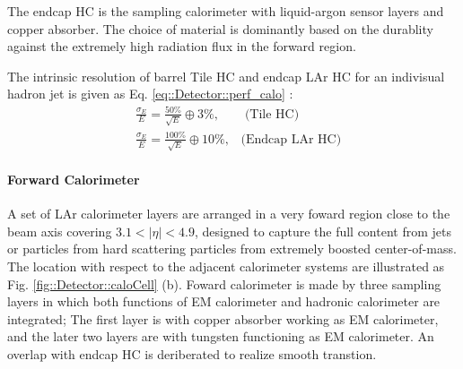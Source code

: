 The endcap HC is the sampling calorimeter with liquid-argon sensor layers and copper absorber. 
The choice of material is dominantly based on the durablity against the extremely high radiation flux in the forward region.


The intrinsic resolution of barrel Tile HC and endcap LAr HC for an indivisual hadron jet is given as Eq. \ref{eq::Detector::perf_calo} \cite{ATLAS_Tile_TDR}: \\
\begin{align}
& \frac{\sigma_E}{E} = \frac{50\%}{\sqrt{E}} \oplus 3\%, \,\,\,\,\,\,\,\,\,\,\,\,  \mbox{(Tile HC)} \\
& \frac{\sigma_E}{E} = \frac{100\%}{\sqrt{E}} \oplus 10\%,  \,\,\,\,\, \mbox{(Endcap LAr HC)}
\label{eq::Detector::perf_calo}
\end{align}


\paragraph{Forward Calorimeter}
A set of LAr calorimeter layers are arranged in a very foward region close to the beam axis covering $3.1<|\eta|<4.9$, 
designed to capture the full content from jets or particles from hard scattering particles from extremely boosted center-of-mass. The location with respect to the adjacent calorimeter systems are illustrated as Fig. \ref{fig::Detector::caloCell} (b).
Foward calorimeter is made by three sampling layers in which both functions of EM calorimeter and hadronic calorimeter are integrated; The first layer is with copper absorber working as EM calorimeter, and the later two layers are with tungsten functioning as EM calorimeter. An overlap with endcap HC is deriberated to realize smooth transtion.


